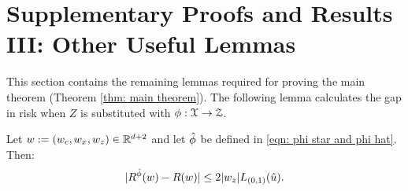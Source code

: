 \section{Supplementary Proofs and Results III: Other Useful Lemmas}

This section contains the remaining lemmas required for proving the main theorem (Theorem \ref{thm: main theorem}).
The following lemma calculates the gap in risk when $Z$ is substituted with $\phi: \mathcal{X} \rightarrow \mathcal{Z}$.

\begin{lem}\label{lem: gap in risk when z is replaced with phi hat}
    Let $w := (w_c,w_x,w_z) \in \mathbb{R}^{d+2}$ and let $\hat{\phi}$ be defined in  \eqref{eqn: phi star and phi hat}. Then:
    \begin{equation*}
        |R^{\hat{\phi}}(w) - R(w)| \leq 2|w_z|L_{(0,1)}(\hat{u}).
    \end{equation*}
\end{lem}

